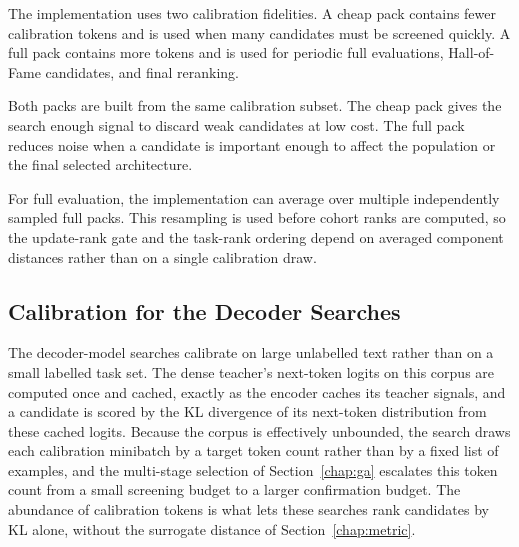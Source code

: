 The implementation uses two calibration fidelities. A cheap pack contains fewer calibration tokens and is used when many candidates must be screened quickly. A full pack contains more tokens and is used for periodic full evaluations, Hall-of-Fame candidates, and final reranking.

Both packs are built from the same calibration subset. The cheap pack gives the search enough signal to discard weak candidates at low cost. The full pack reduces noise when a candidate is important enough to affect the population or the final selected architecture.

For full evaluation, the implementation can average over multiple independently sampled full packs. This resampling is used before cohort ranks are computed, so the update-rank gate and the task-rank ordering depend on averaged component distances rather than on a single calibration draw.

\subsection{Calibration for the Decoder Searches}

The decoder-model searches calibrate on large unlabelled text rather than on a small labelled task set. The dense teacher's next-token logits on this corpus are computed once and cached, exactly as the encoder caches its teacher signals, and a candidate is scored by the KL divergence of its next-token distribution from these cached logits. Because the corpus is effectively unbounded, the search draws each calibration minibatch by a target token count rather than by a fixed list of examples, and the multi-stage selection of Section~\ref{chap:ga} escalates this token count from a small screening budget to a larger confirmation budget. The abundance of calibration tokens is what lets these searches rank candidates by KL alone, without the surrogate distance of Section~\ref{chap:metric}.
